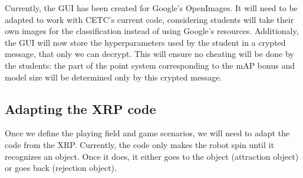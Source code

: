 \documentclass[a4]{article}
\begin{document}
Currently, the GUI has been created for Google's OpenImages. It will need to be adapted to work with CETC's current code, considering students will take their own images for the classification instead of using Google's resources. Additionaly, the GUI will now store the hyperparameters used by the student in a crypted message, that only we can decrypt. This will ensure no cheating will be done by the students: the part of the point system corresponding to the mAP bonus and model size will be determined only by this crypted message.

\subsection*{Adapting the XRP code}

Once we define the playing field and game scenarios, we will need to adapt the code from the XRP. Currently, the code only makes the robot spin until it recognizes an object. Once it does, it either goes to the object (attraction object) or goes back (rejection object).
\end{document}
